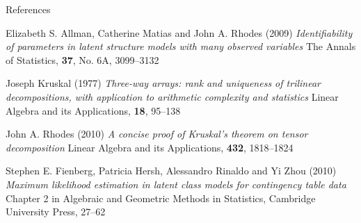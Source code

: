 
\begin{frame}{\Large References}

\scriptsize

Elizabeth S. Allman, Catherine Matias and John A. Rhodes (2009)
\vskip 0.025cm
\textit{Identifiability of parameters in latent structure models with many observed variables}
\vskip 0.025cm
The Annals of Statistics, \textbf{37}, No. 6A, 3099--3132

\vskip 0.5cm
Joseph Kruskal (1977)
\vskip 0.025cm
\textit{Three-way arrays: rank and uniqueness of trilinear decompositions, with application to arithmetic complexity and statistics}
\vskip 0.025cm
Linear Algebra and its Applications,
\textbf{18}, 95--138

\vskip 0.5cm
John A. Rhodes (2010)
\vskip 0.025cm
\textit{A concise proof of Kruskal's theorem on tensor decomposition}
\vskip 0.025cm
Linear Algebra and its Applications, \textbf{432}, 1818--1824

\vskip 0.5cm
Stephen E. Fienberg, Patricia Hersh, Alessandro Rinaldo and Yi Zhou (2010)
\vskip 0.025cm
\textit{Maximum likelihood estimation in latent class models for contingency table data}
\vskip 0.025cm
Chapter 2 in Algebraic and Geometric Methods in Statistics, Cambridge University Press, 27--62

\end{frame}
\normalsize

